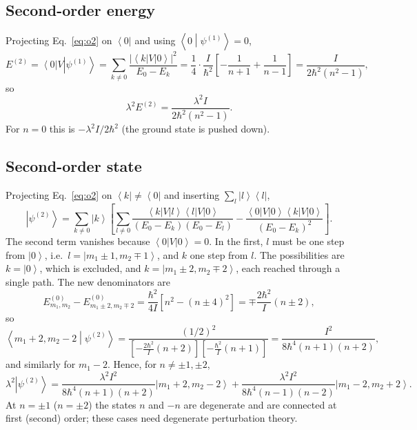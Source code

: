 \documentclass[aps,pra,onecolumn,notitlepage,nofootinbib,11pt]{revtex4-2}
\newcommand{\ket}[1]{\left|#1\right\rangle}
\newcommand{\bra}[1]{\left\langle#1\right|}
\newcommand{\braket}[2]{\left\langle#1\middle|#2\right\rangle}
\begin{document}
\subsection{Second-order energy}

Projecting Eq.~\eqref{eq:o2} on $\bra0$ and using $\braket0{\psi^{(1)}}=0$,
\begin{equation}
E^{(2)}=\bra0V\ket{\psi^{(1)}}=\sum_{k\neq0}\frac{|\bra kV\ket0|^{2}}{E_{0}-E_{k}}
=\frac14\cdot\frac{I}{\hbar^{2}}\left[-\frac{1}{n+1}+\frac{1}{n-1}\right]
=\frac{I}{2\hbar^{2}(n^{2}-1)},
\end{equation}
so
\begin{equation}
\lambda^{2}E^{(2)}=\frac{\lambda^{2}I}{2\hbar^{2}(n^{2}-1)}.
\label{eq:E2}
\end{equation}
For $n=0$ this is $-\lambda^{2}I/2\hbar^{2}$ (the ground state is pushed down).

\subsection{Second-order state}

Projecting Eq.~\eqref{eq:o2} on $\bra k\neq\bra0$ and inserting
$\sum_{l}\ket l\bra l$,
\begin{equation}
\ket{\psi^{(2)}}=\sum_{k\neq0}\ket k\left[\sum_{l\neq0}
\frac{\bra kV\ket l\bra lV\ket0}{(E_{0}-E_{k})(E_{0}-E_{l})}
-\frac{\bra0V\ket0\bra kV\ket0}{(E_{0}-E_{k})^{2}}\right].
\end{equation}
The second term vanishes because $\bra0V\ket0=0$. In the first, $l$ must be one step
from $\ket0$, i.e.\ $l=\ket{m_{1}\pm1,m_{2}\mp1}$, and $k$ one step from $l$. The
possibilities are $k=\ket0$, which is excluded, and
$k=\ket{m_{1}\pm2,m_{2}\mp2}$, each reached through a single path. The new
denominators are
\begin{equation}
E^{(0)}_{m_{1},m_{2}}-E^{(0)}_{m_{1}\pm2,m_{2}\mp2}
=\frac{\hbar^{2}}{4I}\left[n^{2}-(n\pm4)^{2}\right]=\mp\frac{2\hbar^{2}}{I}(n\pm2),
\end{equation}
so
\begin{equation}
\braket{m_{1}+2,m_{2}-2}{\psi^{(2)}}=\frac{(1/2)^{2}}{\left[-\frac{2\hbar^{2}}{I}(n+2)\right]
\left[-\frac{\hbar^{2}}{I}(n+1)\right]}=\frac{I^{2}}{8\hbar^{4}(n+1)(n+2)},
\end{equation}
and similarly for $m_{1}-2$. Hence, for $n\neq\pm1,\pm2$,
\begin{equation}
\lambda^{2}\ket{\psi^{(2)}}=\frac{\lambda^{2}I^{2}}{8\hbar^{4}(n+1)(n+2)}\ket{m_{1}+2,m_{2}-2}
+\frac{\lambda^{2}I^{2}}{8\hbar^{4}(n-1)(n-2)}\ket{m_{1}-2,m_{2}+2}.
\label{eq:psi2}
\end{equation}
At $n=\pm1$ ($n=\pm2$) the states $n$ and $-n$ are degenerate and are connected at
first (second) order; these cases need degenerate perturbation theory.
\end{document}
